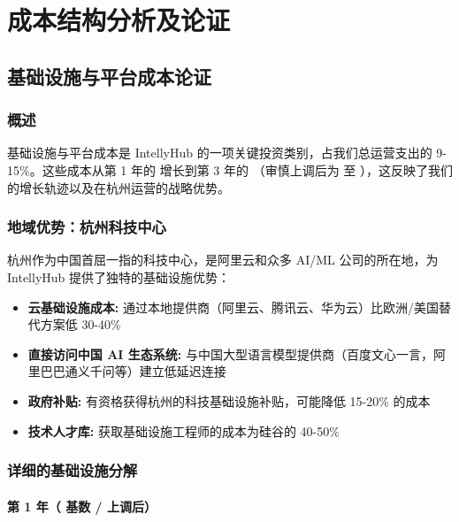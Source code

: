 \documentclass[11pt, a4paper, oneside]{article}
\begin{document}


\restoregeometry
\endgroup

\section{成本结构分析及论证}
\label{sec:cost-analysis}

\subsection{基础设施与平台成本论证}

\subsubsection{概述}
基础设施与平台成本是 IntellyHub 的一项关键投资类别，占我们总运营支出的 9-15\%。这些成本从第 1 年的  增长到第 3 年的 （审慎上调后为  至 ），这反映了我们的增长轨迹以及在杭州运营的战略优势。

\subsubsection{地域优势：杭州科技中心}
杭州作为中国首屈一指的科技中心，是阿里云和众多 AI/ML 公司的所在地，为 IntellyHub 提供了独特的基础设施优势：

\begin{itemize}
    \item \textbf{云基础设施成本:} 通过本地提供商（阿里云、腾讯云、华为云）比欧洲/美国替代方案低 30-40\%
    \item \textbf{直接访问中国 AI 生态系统:} 与中国大型语言模型提供商（百度文心一言，阿里巴巴通义千问等）建立低延迟连接
    \item \textbf{政府补贴:} 有资格获得杭州的科技基础设施补贴，可能降低 15-20\% 的成本
    \item \textbf{技术人才库:} 获取基础设施工程师的成本为硅谷的 40-50\%
\end{itemize}

\subsubsection{详细的基础设施分解}

\paragraph{第 1 年（ 基数 /  上调后）}
\end{document}
